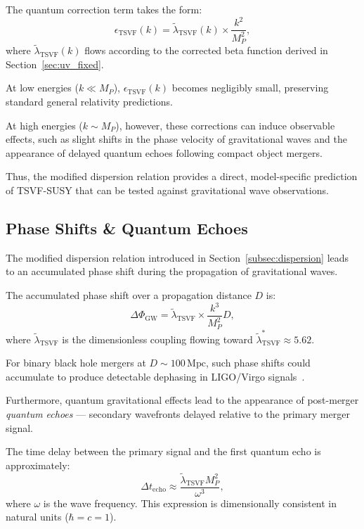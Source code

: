 \documentclass[twocolumn,superscriptaddress,floatfix]{revtex4-2}
\begin{document}
The quantum correction term takes the form:
\begin{equation}
\epsilon_{\text{TSVF}}(k) = \tilde{\lambda}_{\text{TSVF}}(k) \times \frac{k^2}{M_P^2},
\end{equation}
where \(\tilde{\lambda}_{\text{TSVF}}(k)\) flows according to the corrected beta function derived in Section~\ref{sec:uv_fixed}.

At low energies (\(k \ll M_P\)), \(\epsilon_{\text{TSVF}}(k)\) becomes negligibly small, preserving standard general relativity predictions.

At high energies (\(k \sim M_P\)), however, these corrections can induce observable effects, such as slight shifts in the phase velocity of gravitational waves and the appearance of delayed quantum echoes following compact object mergers.

Thus, the modified dispersion relation provides a direct, model-specific prediction of TSVF-SUSY that can be tested against gravitational wave observations.


\subsection{Phase Shifts \& Quantum Echoes}
\label{subsec:phase_echoes}

The modified dispersion relation introduced in Section~\ref{subsec:dispersion} leads to an accumulated phase shift during the propagation of gravitational waves.

The accumulated phase shift over a propagation distance \(D\) is:
\begin{equation}
\Delta\Phi_{\text{GW}} = \tilde{\lambda}_{\text{TSVF}} \times \frac{k^3}{M_P^2} D,
\label{eq:phase_shift}
\end{equation}
where \(\tilde{\lambda}_{\text{TSVF}}\) is the dimensionless coupling flowing toward \(\tilde{\lambda}_{\text{TSVF}}^* \approx 5.62\).

For binary black hole mergers at \(D \sim 100 \, \text{Mpc}\), such phase shifts could accumulate to produce detectable dephasing in LIGO/Virgo signals~\cite{LIGO2021}.

Furthermore, quantum gravitational effects lead to the appearance of post-merger \textit{quantum echoes} — secondary wavefronts delayed relative to the primary merger signal.

The time delay between the primary signal and the first quantum echo is approximately:
\begin{equation}
\Delta t_{\text{echo}} \approx \frac{\tilde{\lambda}_{\text{TSVF}} M_P^2}{\omega^3},
\label{eq:echo_delay}
\end{equation}
where \(\omega\) is the wave frequency. This expression is dimensionally consistent in natural units (\(\hbar = c = 1\)).
\end{document}
